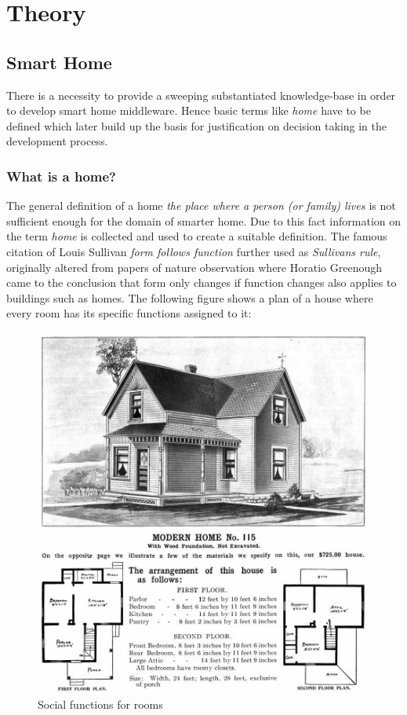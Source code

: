 \section{Theory} %

	\subsection{Smart Home} 
		There is a necessity to provide a sweeping substantiated knowledge-base in order to develop smart home middleware. Hence basic terms like \textit{home} have to be defined which later build up the basis for justification on decision taking in the development process.

		\subsubsection{What is a home?}
			The general definition of a home \textit{the place where a person (or family) lives \parencite{websters1}} is not sufficient enough for the domain of smarter home. Due to this fact information on the term \textit{home} is collected and used to create a suitable definition. The famous citation of Louis Sullivan \textit{form follows function} further used as \textit{Sullivans rule}, originally altered from papers of nature observation where Horatio Greenough came to the conclusion that form only changes if function changes \parencite{FFF} also applies to buildings such as homes. The following figure shows a plan of a house where every room has its specific functions assigned to it:

			\pagebreak

			\begin{figure}[h]
				\centering
					\includegraphics[width=.9\textwidth]{images/theory/RoomFunctions.jpg}
				\caption{Social functions for rooms}
				\label{fig:RoomFunctions}
			\end{figure}

